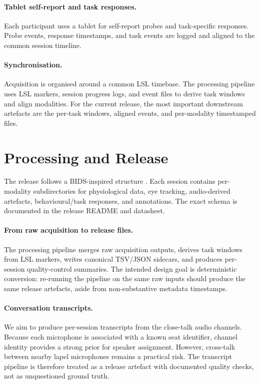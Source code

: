 \documentclass{article}
\begin{document}
\paragraph{Tablet self-report and task responses.}
Each participant uses a tablet for self-report probes and task-specific
responses.
Probe events, response timestamps, and task events are logged and aligned to
the common session timeline.

\paragraph{Synchronisation.}
Acquisition is organised around a common LSL timebase.
The processing pipeline uses LSL markers, session progress logs, and
event files to derive task windows and align modalities.
For the current release, the most important downstream artefacts are the
per-task windows, aligned events, and per-modality timestamped files.

\section{Processing and Release}
\label{sec:processing}

The release follows a BIDS-inspired structure \cite{gorgolewski2016brain}.
Each session contains per-modality subdirectories for physiological data,
eye tracking, audio-derived artefacts, behavioural/task responses, and
annotations.
The exact schema is documented in the release README and datasheet.

\paragraph{From raw acquisition to release files.}
The processing pipeline merges raw acquisition outputs, derives task windows
from LSL markers, writes canonical TSV/JSON sidecars, and produces
per-session quality-control summaries.
The intended design goal is deterministic conversion: re-running the pipeline
on the same raw inputs should produce the same release artefacts, aside from
non-substantive metadata timestamps.

\paragraph{Conversation transcripts.}
We aim to produce per-session transcripts from the close-talk audio channels.
Because each microphone is associated with a known seat identifier, channel
identity provides a strong prior for speaker assignment.
However, cross-talk between nearby lapel microphones remains a practical risk.
The transcript pipeline is therefore treated as a release artefact with
documented quality checks, not as unquestioned ground truth.
\end{document}
